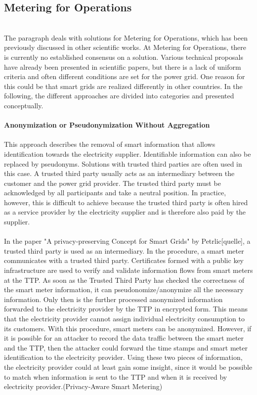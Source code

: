 \subsection{Metering for Operations}
\\
The paragraph deals with solutions for Metering for Operations, which has been previously discussed in other scientific works. At Metering for Operations, there is currently no established consensus on a solution. Various technical proposals have already been presented in scientific papers, but there is a lack of uniform criteria and often different conditions are set for the power grid. One reason for this could be that smart grids are realized differently in other countries. In the following, the different approaches are divided into categories and presented conceptually.\\
\\
\textbf{Anonymization or Pseudonymization
Without Aggregation}
\\
\\
This approach describes the removal of smart information that allows identification towards the electricity supplier. Identifiable information can also be replaced by pseudonyms. Solutions with trusted third parties are often used in this case. A trusted third party usually acts as an intermediary between the customer and the power grid provider. The trusted third party must be acknowledged by all participants and take a neutral position. In practice, however, this is difficult to achieve because the trusted third party is often hired as a service provider by the electricity supplier and is therefore also paid by the supplier.\\
\\
In the paper "A privacy-preserving Concept for Smart Grids" by Petrlic[quelle], a trusted third party is used as an intermediary. In the procedure, a smart meter communicates with a trusted third party. Certificates formed with a public key infrastructure are used to verify and validate information flows from smart meters at the TTP. As soon as the Trusted Third Party has checked the correctness of the smart meter information, it can pseudonomize/anonymize all the necessary information. Only then is the further processed anonymized information forwarded to the electricity provider by the TTP in encrypted form. This means that the electricity provider cannot assign individual electricity consumption to its customers. With this procedure, smart meters can be anonymized. 
However, if it is possible for an attacker to record the data traffic between the smart meter and the TTP, then the attacker could forward the time stamps and smart meter identification to the electricity provider. Using these two pieces of information, the electricity provider could at least gain some insight, since it would be possible to match when information is sent to the TTP and when it is received by electricity provider.(Privacy-Aware Smart Metering) \\
